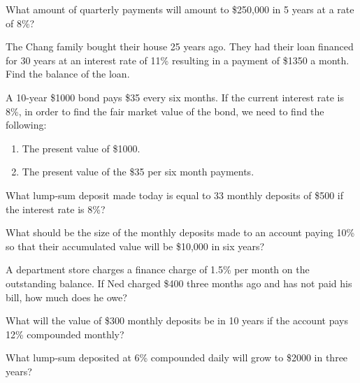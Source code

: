 \begin{puzzle}
    What amount of quarterly payments will amount to \$250,000 in 5 years at a rate of 8\%?
\end{puzzle}

\begin{puzzle}
    The Chang family bought their house 25 years ago. They had their loan financed for 30 years at an interest rate of 11\% resulting in a payment of \$1350 a month. Find the balance of the loan.
\end{puzzle}

\begin{puzzle}
    A 10-year \$1000 bond pays \$35 every six months. If the current interest rate is 8\%, in order to find the fair market value of the bond, we need to find the following:
    \begin{enumerate}
        \item The present value of \$1000.
        \item The present value of the \$35 per six month payments.
    \end{enumerate}
\end{puzzle}

\begin{puzzle}
    What lump-sum deposit made today is equal to 33 monthly deposits of \$500 if the interest rate is 8\%?
\end{puzzle}

\begin{puzzle}
    What should be the size of the monthly deposits made to an account paying 10\% so that their accumulated value will be \$10,000 in six years?
\end{puzzle}

\begin{puzzle}
    A department store charges a finance charge of 1.5\% per month on the outstanding balance. If Ned charged \$400 three months ago and has not paid his bill, how much does he owe?
\end{puzzle}

\begin{puzzle}
    What will the value of \$300 monthly deposits be in 10 years if the account pays 12\% compounded monthly?
\end{puzzle}

\begin{puzzle}
    What lump-sum deposited at 6\% compounded daily will grow to \$2000 in three years?
\end{puzzle}

